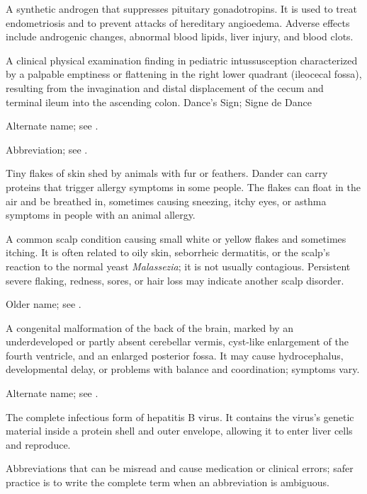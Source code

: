  A synthetic androgen that suppresses pituitary gonadotropins. It is used to treat endometriosis and to prevent attacks of hereditary angioedema. Adverse effects include androgenic changes, abnormal blood lipids, liver injury, and blood clots.

 A clinical physical examination finding in pediatric intussusception characterized by a palpable emptiness or flattening in the right lower quadrant (ileocecal fossa), resulting from the invagination and distal displacement of the cecum and terminal ileum into the ascending colon.
\synonyms
Dance's Sign; Signe de Dance

 Alternate name; see .


 Abbreviation; see .


 Tiny flakes of skin shed by animals with fur or feathers. Dander
can carry proteins that trigger allergy symptoms in some people. The flakes can
float in the air and be breathed in, sometimes causing sneezing, itchy eyes, or
asthma symptoms in people with an animal allergy.

 A common scalp condition causing small white or yellow flakes and sometimes itching. It is often related to oily skin, seborrheic dermatitis, or the scalp's reaction to the normal yeast \textit{Malassezia}; it is not usually contagious. Persistent severe flaking, redness, sores, or hair loss may indicate another scalp disorder.

 Older name; see .

 A congenital malformation of the back of the brain, marked by an underdeveloped or partly absent cerebellar vermis, cyst-like enlargement of the fourth ventricle, and an enlarged posterior fossa. It may cause hydrocephalus, developmental delay, or problems with balance and coordination; symptoms vary.

 Alternate name; see .

 The complete infectious form of hepatitis B virus. It contains the virus's genetic material inside a protein shell and outer envelope, allowing it to enter liver cells and reproduce.

 Abbreviations that can be misread and cause medication or clinical errors; safer practice is to write the complete term when an abbreviation is ambiguous.

